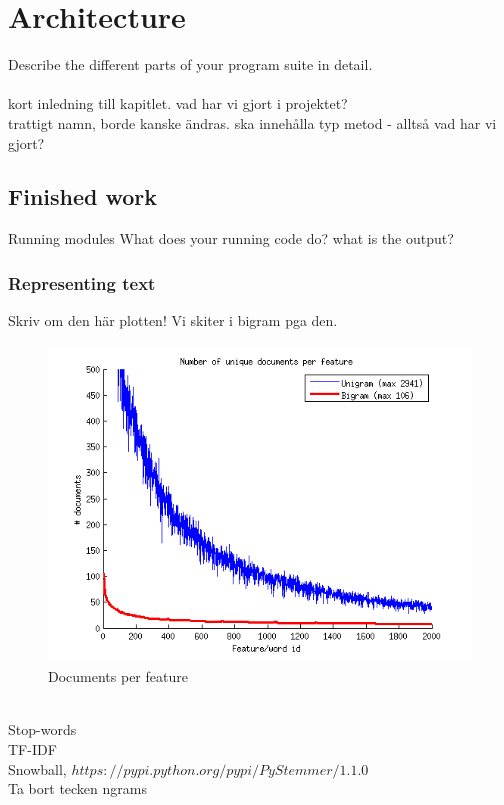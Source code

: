 \chapter{Architecture}
Describe the different parts of your program suite in detail.
\\\\
kort inledning till kapitlet. vad har vi gjort i projektet?\\
trattigt namn, borde kanske ändras. ska innehålla typ metod - alltså vad har vi gjort?

\section{Finished work}
Running modules
What does your running code do? what is the output?
\subsection{Representing text}

Skriv om den här plotten! Vi skiter i bigram pga den.
\begin{figure}[h!]
\centering
\includegraphics[scale = 0.5]{fig/documents_per_feature.png}
\caption{Documents per feature}
\label{fig:trainingsize}
\end{figure} \\




Stop-words \\
TF-IDF \\
Snowball, $https://pypi.python.org/pypi/PyStemmer/1.1.0$ \\
Ta bort tecken
ngrams
